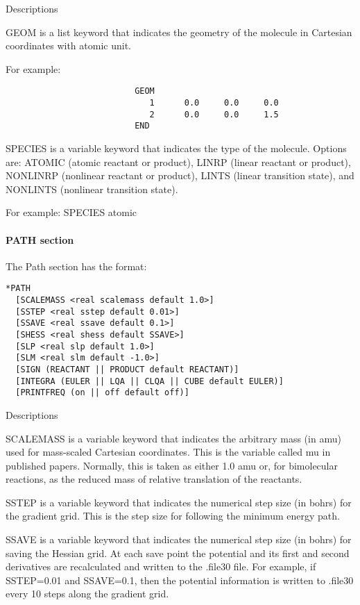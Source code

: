   Descriptions

    GEOM is a list keyword that indicates the geometry of the molecule
              in Cartesian coordinates with atomic unit.

              For example:
\begin{verbatim}
                          GEOM
                             1      0.0     0.0     0.0
                             2      0.0     0.0     1.5
                          END 
\end{verbatim}

    SPECIES is a variable keyword that indicates the type of the 
              molecule.  Options are: ATOMIC (atomic reactant or product), 
              LINRP (linear reactant or product), NONLINRP
              (nonlinear reactant or product), LINTS (linear transition 
              state), and NONLINTS (nonlinear transition state).

              For example:
                          SPECIES  atomic

\paragraph{PATH section}

The Path section has the format:

\begin{verbatim}
*PATH
  [SCALEMASS <real scalemass default 1.0>]
  [SSTEP <real sstep default 0.01>]
  [SSAVE <real ssave default 0.1>]
  [SHESS <real shess default SSAVE>]
  [SLP <real slp default 1.0>]
  [SLM <real slm default -1.0>]
  [SIGN (REACTANT || PRODUCT default REACTANT)]
  [INTEGRA (EULER || LQA || CLQA || CUBE default EULER)]
  [PRINTFREQ (on || off default off)]
\end{verbatim}

  Descriptions

    SCALEMASS is a variable keyword that indicates the arbitrary
              mass (in amu) used for mass-scaled Cartesian coordinates. 
              This is the variable called mu in published papers.  Normally,
              this is taken as either 1.0 amu or, for bimolecular reactions,
              as the reduced mass of relative translation of the reactants.
      
    SSTEP is a variable keyword that indicates the numerical step
              size (in bohrs) for the gradient grid.  This is the step
              size for following the minimum energy path.

    SSAVE is a variable keyword that indicates the numerical step
              size (in bohrs) for saving the Hessian grid. At each
              save point the potential and its first and second
              derivatives are recalculated and written to the .file30
              file. For example, if SSTEP=0.01 and SSAVE=0.1, then the
              potential information is written to .file30 every 10
              steps along the gradient grid.

